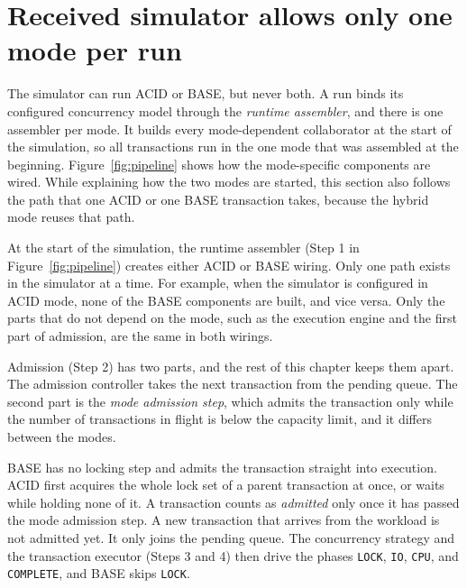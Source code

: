 \section{Received simulator allows only one mode per run}\label{sec:approach-pipeline}

The simulator can run ACID or BASE, but never both. A run binds its
configured concurrency model through the \emph{runtime assembler}, and there
is one assembler per mode. It builds every mode-dependent collaborator at the
start of the simulation, so all transactions run in the one mode that was
assembled at the beginning. Figure~\ref{fig:pipeline} shows how the
mode-specific components are wired. While explaining how the two modes are
started, this section also follows the path that one ACID or one BASE
transaction takes, because the hybrid mode reuses that path.

At the start of the simulation, the runtime assembler (Step 1 in
Figure~\ref{fig:pipeline}) creates either ACID or BASE wiring. Only
one path exists in the simulator at a time. For example, when the simulator
is configured in ACID mode, none of the BASE components are built, and vice
versa. Only the parts that do not depend on the mode, such as the execution
engine and the first part of admission, are the same in both wirings.

Admission (Step 2) has two parts, and the rest of this chapter keeps them apart. The admission controller takes the
next transaction from the pending queue. The second part is the
\emph{mode admission step}, which admits the transaction only while the number of
transactions in flight is below the capacity limit, and it differs between the modes.


BASE has no locking step and admits the transaction straight into execution.
ACID first acquires the whole lock set of a parent transaction at once, or waits
while holding none of it. A transaction counts as \emph{admitted} only once it
has passed the mode admission step. A new transaction that arrives from the
workload is not admitted yet. It only joins the pending queue. The concurrency
strategy and the transaction executor (Steps 3 and 4) then drive the phases
\texttt{LOCK}, \texttt{IO}, \texttt{CPU}, and \texttt{COMPLETE}, and BASE skips
\texttt{LOCK}.\label{sec:approach-execution}

